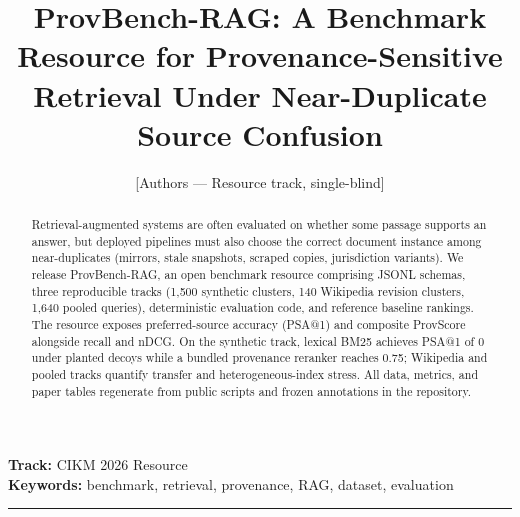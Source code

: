 \documentclass[11pt]{article}
\title{ProvBench-RAG: A Benchmark Resource for Provenance-Sensitive Retrieval Under Near-Duplicate Source Confusion}
\author{[Authors --- Resource track, single-blind]}
\date{}
\begin{document}
\maketitle
\thispagestyle{empty}

\noindent\textbf{Track:} CIKM 2026 Resource \\
\noindent\textbf{Keywords:} benchmark, retrieval, provenance, RAG, dataset, evaluation

\vspace{0.75em}
\noindent\rule{\textwidth}{0.4pt}
\vspace{0.75em}

\begin{abstract}
\noindent
Retrieval-augmented systems are often evaluated on whether some passage supports an answer, but deployed pipelines must also choose the correct document instance among near-duplicates (mirrors, stale snapshots, scraped copies, jurisdiction variants).
We release ProvBench-RAG, an open benchmark resource comprising JSONL schemas, three reproducible tracks (1,500 synthetic clusters, 140 Wikipedia revision clusters, 1,640 pooled queries), deterministic evaluation code, and reference baseline rankings.
The resource exposes preferred-source accuracy (PSA@1) and composite ProvScore alongside recall and nDCG.
On the synthetic track, lexical BM25 achieves PSA@1 of 0 under planted decoys while a bundled provenance reranker reaches 0.75; Wikipedia and pooled tracks quantify transfer and heterogeneous-index stress.
All data, metrics, and paper tables regenerate from public scripts and frozen annotations in the repository.
\end{abstract}
\end{document}
